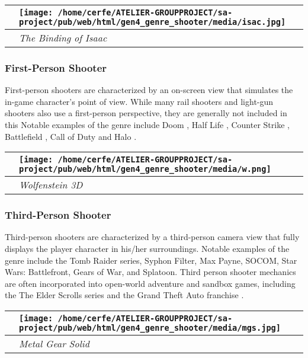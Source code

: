 \documentclass[a4paper,10pt]{book}
\begin{document}
 \begin{longtable}{p{1mm}|l|}\hline
 
 & \texttt{[image: /home/cerfe/ATELIER-GROUPPROJECT/sa-project/pub/web/html/gen4\_genre\_shooter/media/isac.jpg]}
 \\\hline
 
 & \textit{The Binding of Isaac }
 \\\hline
 \end{longtable}
 
 \subsubsection{First-Person Shooter }
 
            First-person shooters are characterized by an on-screen view that simulates the in-game character's point of view. While many rail shooters and light-gun shooters also use a first-person perspective, they are generally not included in this  
            Notable examples of the genre include  Doom , 
             Half Life , 
             Counter Strike , 
             Battlefield , 
             Call of Duty  and 
             Halo .
         
 \begin{longtable}{p{1mm}|l|}\hline
 
 & \texttt{[image: /home/cerfe/ATELIER-GROUPPROJECT/sa-project/pub/web/html/gen4\_genre\_shooter/media/w.png]}
 \\\hline
 
 & \textit{Wolfenstein 3D }
 \\\hline
 \end{longtable}
 
 \subsubsection{Third-Person Shooter }
 
            Third-person shooters are characterized by a third-person camera view that fully displays the player character in his/her surroundings.  
            Notable examples of the genre include the Tomb Raider series, Syphon Filter, Max Payne, SOCOM, Star Wars: Battlefront, Gears of War, and Splatoon.  
            Third person shooter mechanics are often incorporated into open-world adventure and sandbox games, including the  The Elder Scrolls series  and the  Grand Theft Auto franchise  .
           
 \begin{longtable}{p{1mm}|l|}\hline
 
 & \texttt{[image: /home/cerfe/ATELIER-GROUPPROJECT/sa-project/pub/web/html/gen4\_genre\_shooter/media/mgs.jpg]}
 \\\hline
 
 & \textit{Metal Gear Solid }
 \\\hline
 \end{longtable}
 
\end{document}
